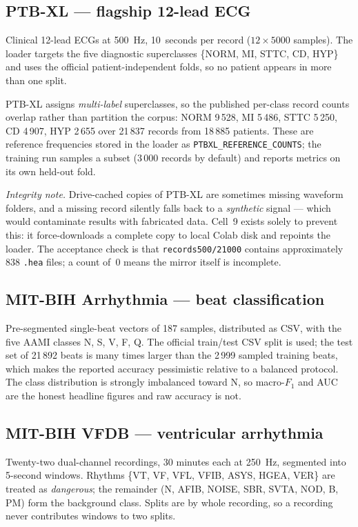 \documentclass[11pt,a4paper]{article}
\newcommand{\code}[1]{\texttt{\small #1}}
\begin{document}
\subsection{PTB-XL --- flagship 12-lead ECG}

Clinical 12-lead ECGs at 500~Hz, 10~seconds per record
($12\times5000$ samples). The loader targets the five diagnostic
superclasses \{NORM, MI, STTC, CD, HYP\} and uses the official
patient-independent folds, so no patient appears in more than one split.

PTB-XL assigns \emph{multi-label} superclasses, so the published
per-class record counts overlap rather than partition the corpus:
NORM 9\,528, MI 5\,486, STTC 5\,250, CD 4\,907, HYP 2\,655 over 21\,837
records from 18\,885 patients. These are reference frequencies stored in
the loader as \code{PTBXL\_REFERENCE\_COUNTS}; the training run samples a
subset (3\,000 records by default) and reports metrics on its own held-out
fold.

\emph{Integrity note.} Drive-cached copies of PTB-XL are sometimes missing
waveform folders, and a missing record silently falls back to a
\emph{synthetic} signal --- which would contaminate results with fabricated
data. Cell~9 exists solely to prevent this: it force-downloads a complete
copy to local Colab disk and repoints the loader. The acceptance check is
that \code{records500/21000} contains approximately 838 \code{.hea} files;
a count of~0 means the mirror itself is incomplete.

\subsection{MIT-BIH Arrhythmia --- beat classification}

Pre-segmented single-beat vectors of 187 samples, distributed as CSV, with
the five AAMI classes N, S, V, F, Q. The official train/test CSV split is
used; the test set of 21\,892 beats is many times larger than the 2\,999
sampled training beats, which makes the reported accuracy pessimistic
relative to a balanced protocol. The class distribution is strongly
imbalanced toward N, so macro-$F_1$ and AUC are the honest headline
figures and raw accuracy is not.

\subsection{MIT-BIH VFDB --- ventricular arrhythmia}

Twenty-two dual-channel recordings, 30 minutes each at 250~Hz, segmented
into 5-second windows. Rhythms \{VT, VF, VFL, VFIB, ASYS, HGEA, VER\} are
treated as \emph{dangerous}; the remainder (N, AFIB, NOISE, SBR, SVTA,
NOD, B, PM) form the background class. Splits are by whole recording, so a
recording never contributes windows to two splits.
\end{document}
